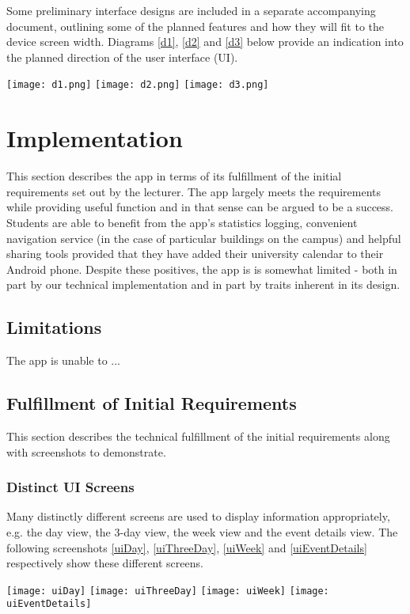 \documentclass{article}
\begin{document}
Some preliminary interface designs are included in a separate accompanying document, outlining some of the planned features and how they will fit to the device screen width. Diagrams \ref{d1}, \ref{d2} and \ref{d3} below provide an indication into the planned direction of the user interface (UI).

\texttt{[image: d1.png]}
\texttt{[image: d2.png]}
\texttt{[image: d3.png]}

\section{Implementation}
This section describes the app in terms of its fulfillment of the initial requirements set out by the lecturer. The app largely meets the requirements while providing useful function and in that sense can be argued to be a success. Students are able to benefit from the app's statistics logging, convenient navigation service (in the case of particular buildings on the campus) and helpful sharing tools provided that they have added their university calendar to their Android phone. Despite these positives, the app is is somewhat limited - both in part by our technical implementation and in part by traits inherent in its design. 

\subsection{Limitations}
The app is unable to ...

\subsection{Fulfillment of Initial Requirements}
This section describes the technical fulfillment of the initial requirements along with screenshots to demonstrate.

\subsubsection{Distinct UI Screens}
Many distinctly different screens are used to display information appropriately, e.g. the day view, the 3-day view, the week view and the event details view. The following screenshots \ref{uiDay}, \ref{uiThreeDay}, \ref{uiWeek} and \ref{uiEventDetails} respectively show these different screens.

\texttt{[image: uiDay]}
\texttt{[image: uiThreeDay]}
\texttt{[image: uiWeek]}
\texttt{[image: uiEventDetails]}
\end{document}

